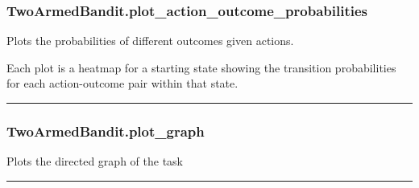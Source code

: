 \subsubsection{TwoArmedBandit.plot\_action\_outcome\_probabilities}\label{twoarmedbandit.plot_action_outcome_probabilities}

\begin{Shaded}
\begin{Highlighting}[]
\OperatorTok{=}\OperatorTok{=}\OperatorTok{=}\OperatorTok{=}\NormalTok{)}
\end{Highlighting}
\end{Shaded}

Plots the probabilities of different outcomes given actions.

Each plot is a heatmap for a starting state showing the transition
probabilities for each action-outcome pair within that state.

\begin{center}\rule{0.5\linewidth}{\linethickness}\end{center}

\subsubsection{TwoArmedBandit.plot\_graph}\label{twoarmedbandit.plot_graph}

\begin{Shaded}
\begin{Highlighting}[]
\OperatorTok{=}\OperatorTok{=}\OperatorTok{=}\OperatorTok{=}\OperatorTok{=}\OperatorTok{=}\OperatorTok{=}\OperatorTok{=}\NormalTok{)}
\end{Highlighting}
\end{Shaded}

Plots the directed graph of the task

\begin{center}\rule{0.5\linewidth}{\linethickness}\end{center}

